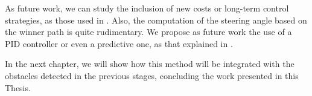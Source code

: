As future work, we can study the inclusion of new costs or long-term control strategies, as those used in \cite{werling2010optimal}. Also, the computation of the steering angle based on the winner path is quite rudimentary. We propose as future work the use of a PID controller or even a predictive one, as that explained in .

In the next chapter, we will show how this method will be integrated with the obstacles detected in the previous stages, concluding the work presented in this Thesis.

